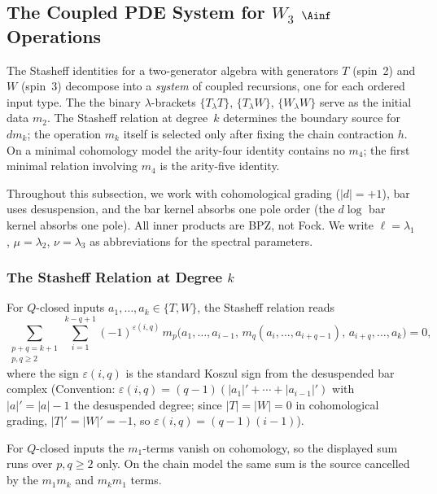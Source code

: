\subsection{The Coupled PDE System for $W_3$ $\Ainf$ Operations}
\label{subsec:w3-coupled-pde}

\providecommand{\Assoc}{\mathfrak{A}}

The Stasheff identities for a two-generator algebra with generators $T$
(spin~2) and $W$ (spin~3) decompose into a \emph{system} of coupled
recursions, one for each ordered input type. The
the binary $\lambda$-brackets $\{T_\lambda T\}$, $\{T_\lambda W\}$,
$\{W_\lambda W\}$ serve as the initial data \(m_2\). The Stasheff
relation at degree~$k$ determines the boundary source for \(d m_k\);
the operation \(m_k\) itself is selected only after fixing the chain
contraction \(h\). On a minimal cohomology model the arity-four identity
contains no \(m_4\); the first minimal relation involving \(m_4\) is the
arity-five identity.

Throughout this subsection, we work with cohomological grading
($|d| = +1$), bar uses desuspension, and the bar kernel absorbs one
pole order (the $d\log$ bar kernel absorbs one pole). All inner products are BPZ, not Fock.
We write $\ell = \lambda_1$, $\mu = \lambda_2$, $\nu = \lambda_3$
as abbreviations for the spectral parameters.

\subsubsection{The Stasheff Relation at Degree $k$}

For $Q$-closed inputs $a_1, \ldots, a_k \in \{T, W\}$, the Stasheff
relation reads
\begin{equation}
\label{eq:w3-stasheff-k}
\sum_{\substack{p+q = k+1 \\ p,q \ge 2}}
\sum_{i=1}^{k-q+1}
(-1)^{\varepsilon(i,q)}\,
m_p\bigl(a_1, \ldots, a_{i-1},\, m_q(a_i, \ldots, a_{i+q-1}),\, a_{i+q}, \ldots, a_k\bigr) = 0,
\end{equation}
where the sign $\varepsilon(i,q)$ is the standard Koszul sign from the
desuspended bar complex (Convention: $\varepsilon(i,q) =
(q-1)(|a_1|' + \cdots + |a_{i-1}|')$ with $|a|' = |a| - 1$ the
desuspended degree; since $|T| = |W| = 0$ in cohomological grading,
$|T|' = |W|' = -1$, so $\varepsilon(i,q) = (q-1)(i-1)$).

For $Q$-closed inputs the $m_1$-terms vanish on cohomology, so the
displayed sum runs over $p, q \ge 2$ only. On the chain model the same
sum is the source cancelled by the \(m_1m_k\) and \(m_km_1\) terms.

